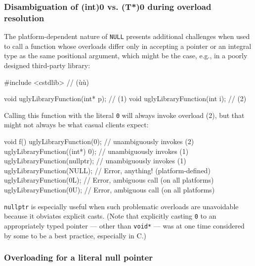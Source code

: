 \subsubsection[Disambiguation of \lstinline!(int)0! vs. \lstinline!(T*)0! during overload resolution]{Disambiguation of {\SubsubsecCode (int)0} vs. {\SubsubsecCode (T*)0} during overload resolution}\label{disambiguation-of-(int)-0-versus-(t*)-0-during-overload-resolution}

The platform-dependent nature of \lstinline!NULL! presents additional
challenges when used to call a function whose overloads differ only in
accepting a pointer or an integral type as the same positional argument, which might be the case, e.g., in a poorly designed third-party
library:

\begin{emcppshiddenlisting}[emcppsbatch=e3]
#include <cstdlib>  // (ù{}ù)
\end{emcppshiddenlisting}
\begin{emcppslisting}[emcppsbatch=e3]
void uglyLibraryFunction(int* p);  // (1)
void uglyLibraryFunction(int  i);  // (2)
\end{emcppslisting}


\noindent Calling this function with the literal \lstinline!0! will always invoke
overload (2), but that might not always be what casual clients expect:

\begin{emcppslisting}[emcppsbatch=e3]
void f()
{
    uglyLibraryFunction(0);         // unambiguously invokes (2)
    uglyLibraryFunction((int*) 0);  // unambiguously invokes (1)
    uglyLibraryFunction(nullptr);   // unambiguously invokes (1)
    uglyLibraryFunction(NULL);      // Error, anything! (platform-defined)
    uglyLibraryFunction(0L);        // Error, ambiguous call (on all platforms)
    uglyLibraryFunction(0U);        // Error, ambiguous call (on all platforms)
}
\end{emcppslisting}


\noindent\lstinline!nullptr! is especially useful when such problematic overloads
are unavoidable because it obviates explicit
casts. (Note that explicitly casting \lstinline!0! to an
appropriately typed pointer --- other than \lstinline!void*! --- was at one
  time considered by some to be a best practice, especially in C.)

\subsubsection[Overloading for a literal null pointer]{Overloading for a literal null pointer}\label{overloading-for-a-literal-null-pointer}

